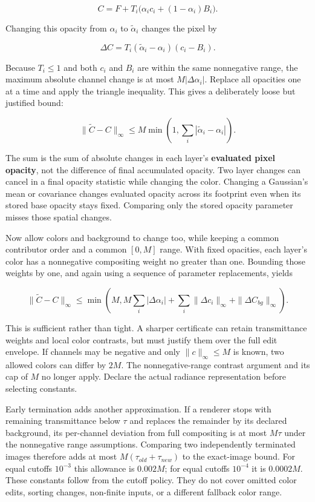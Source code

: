 \[
C=F+T_i\bigl(\alpha_i c_i+(1-\alpha_i)B_i\bigr).
\]

Changing this opacity from \(\alpha_i\) to \(\widetilde\alpha_i\) changes the pixel by

\[
\Delta C=T_i(\widetilde\alpha_i-\alpha_i)(c_i-B_i).
\]

Because \(T_i\le1\) and both \(c_i\) and \(B_i\) are within the same nonnegative range, the maximum absolute channel change is at most \(M|\Delta\alpha_i|\). Replace all opacities one at a time and apply the triangle inequality. This gives a deliberately loose but justified bound:

\[
\|\widetilde C-C\|_\infty
\le M\min\left(1,\sum_i|\widetilde\alpha_i-\alpha_i|\right).
\]

The sum is the sum of absolute changes in each layer's \textbf{evaluated pixel opacity}, not the difference of final accumulated opacity. Two layer changes can cancel in a final opacity statistic while changing the color. Changing a Gaussian's mean or covariance changes evaluated opacity across its footprint even when its stored base opacity stays fixed. Comparing only the stored opacity parameter misses those spatial changes.

Now allow colors and background to change too, while keeping a common contributor order and a common \([0,M]\) range. With fixed opacities, each layer's color has a nonnegative compositing weight no greater than one. Bounding those weights by one, and again using a sequence of parameter replacements, yields

\[
\|\widetilde C-C\|_\infty
\le\min\left(
 M,
 M\sum_i|\Delta\alpha_i|
 +\sum_i\|\Delta c_i\|_\infty
 +\|\Delta C_{bg}\|_\infty
\right).
\]

This is sufficient rather than tight. A sharper certificate can retain transmittance weights and local color contrasts, but must justify them over the full edit envelope. If channels may be negative and only \(\|c\|_\infty\le M\) is known, two allowed colors can differ by \(2M\). The nonnegative-range contrast argument and its cap of \(M\) no longer apply. Declare the actual radiance representation before selecting constants.

Early termination adds another approximation. If a renderer stops with remaining transmittance below \(\tau\) and replaces the remainder by its declared background, its per-channel deviation from full compositing is at most \(M\tau\) under the nonnegative range assumptions. Comparing two independently terminated images therefore adds at most \(M(\tau_{old}+\tau_{new})\) to the exact-image bound. For equal cutoffs \(10^{-3}\) this allowance is \(0.002M\); for equal cutoffs \(10^{-4}\) it is \(0.0002M\). These constants follow from the cutoff policy. They do not cover omitted color edits, sorting changes, non-finite inputs, or a different fallback color range.


